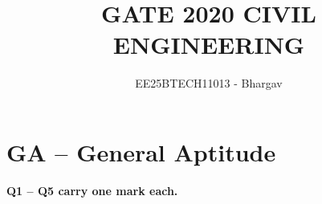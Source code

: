 \documentclass[journal]{IEEEtran}
\begin{document}




\title{GATE 2020 CIVIL ENGINEERING}
\author{EE25BTECH11013 - Bhargav}
\maketitle
{\let\newpage\relax\maketitle}

\renewcommand{\thefigure}{\theenumi}
\renewcommand{\thetable}{\theenumi}
\setlength{\intextsep}{10pt} %

\section*{GA -- General Aptitude}

\noindent \textbf{Q1 -- Q5 carry one mark each.}
\end{document}

